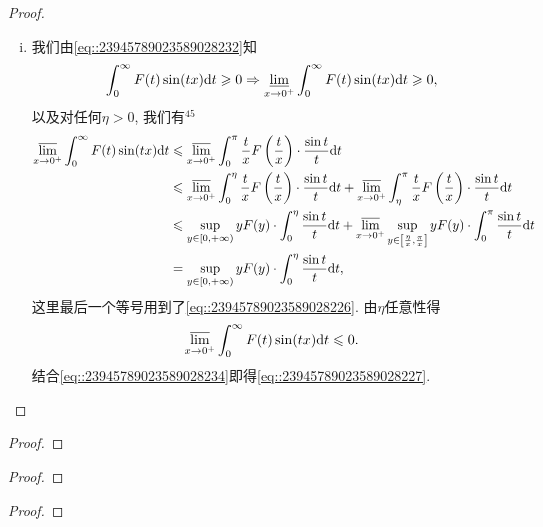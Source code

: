 \documentclass[../../main.tex]{subfiles}
\begin{document}
\begin{proof}
\begin{enumerate}[(i)]
\item 我们由\eqref{eq::23945789023589028232}知
\begin{align}
\int_0^\infty F(t)\sin(tx)\mathrm{d}t \geqslant 0 \Rightarrow \varliminf_{x \to 0^+} \int_0^\infty F(t)\sin(tx)\mathrm{d}t \geqslant 0, \label{eq::23945789023589028234}
\end{align}
以及对任何$\eta > 0$, 我们有$^{45}$
\begin{align*}
\varlimsup_{x \to 0^+} \int_0^\infty F(t)\sin(tx)\mathrm{d}t &\leqslant \varlimsup_{x \to 0^+} \int_0^\pi \frac{t}{x}F\left(\frac{t}{x}\right) \cdot \frac{\sin t}{t}\mathrm{d}t \\
&\leqslant \varlimsup_{x \to 0^+} \int_0^\eta \frac{t}{x}F\left(\frac{t}{x}\right) \cdot \frac{\sin t}{t}\mathrm{d}t + \varlimsup_{x \to 0^+} \int_\eta^\pi \frac{t}{x}F\left(\frac{t}{x}\right) \cdot \frac{\sin t}{t}\mathrm{d}t \\
&\leqslant \sup_{y \in [0,+\infty)} yF(y) \cdot \int_0^\eta \frac{\sin t}{t}\mathrm{d}t + \varlimsup_{x \to 0^+} \sup_{y \in \left[ \frac{\eta}{x}, \frac{\pi}{x} \right]} yF(y) \cdot \int_0^\pi \frac{\sin t}{t}\mathrm{d}t \\
&= \sup_{y \in [0,+\infty)} yF(y) \cdot \int_0^\eta \frac{\sin t}{t}\mathrm{d}t,
\end{align*}
这里最后一个等号用到了\eqref{eq::23945789023589028226}. 由$\eta$任意性得
\[
\varlimsup_{x \to 0^+} \int_0^\infty F(t)\sin(tx)\mathrm{d}t \leqslant 0.
\]
结合\eqref{eq::23945789023589028234}即得\eqref{eq::23945789023589028227}.
\end{enumerate}
\end{proof}

\begin{example}

\end{example}
\begin{proof}

\end{proof}

\begin{example}

\end{example}
\begin{proof}

\end{proof}

\begin{example}

\end{example}
\begin{proof}

\end{proof}
\end{document}
